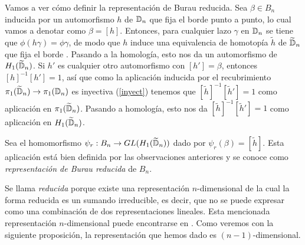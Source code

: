 \documentclass[TFG.tex]{subfiles}
\begin{document}


Vamos a ver cómo definir la representación de Burau reducida. Sea $\beta\in B_n$ inducida por un automorfismo $h$ de $\mathbb{D}_n$ que fija el borde punto a punto, lo cual vamos a denotar como $\beta=[h]$. Entonces, para cualquier lazo $\gamma$ en $\mathbb{D}_n$ se tiene que $\phi(h\gamma)=\phi\gamma$, de modo que $h$ induce una equivalencia de homotopía $\tilde{h}$ de $\widetilde{\mathbb{D}}_n$ que fija el borde \cite{Hatcher}. Pasando a la homología, esto nos da un automorfismo de $H_1(\widetilde{\mathbb{D}}_n)$. Si $h'$ es cualquier otro automorfismo con $[h']=\beta$, entonces $[h]^{-1}[h']=1$, así que como la aplicación inducida por el recubrimiento $\pi_1(\widetilde{\mathbb{D}}_n)\to\pi_1(\mathbb{D}_n)$ es inyectiva (\ref{inyect}) tenemos que $[\tilde{h}]^{-1}[\tilde{h}']=1$ como aplicación en $\pi_1(\widetilde{\mathbb{D}}_n)$. Pasando a homología, esto nos da $[\tilde{h}]^{-1}[\tilde{h}']=1$ como aplicación en $H_1(\widetilde{\mathbb{D}}_n)$. 






\begin{defi}
Sea el homomorfismo $\psi_r:B_n\to GL(H_1(\widetilde{\mathbb{D}}_n))$ dado por $\psi_r(\beta)=[\tilde{h}]$. Esta aplicación está bien definida por las observaciones anteriores y se conoce como \emph{representación de Burau reducida} de $B_n$.
\end{defi}

Se llama \emph{reducida} porque existe una representación $n$-dimensional de la cual la forma reducida es un sumando irreducible, es decir, que no se puede expresar como una combinación de dos representaciones lineales. Esta mencionada representación $n$-dimensional puede encontrarse en \cite{thesis}. Como veremos con la siguiente proposición, la representación que hemos dado es $(n-1)$-dimensional.

\end{document}

